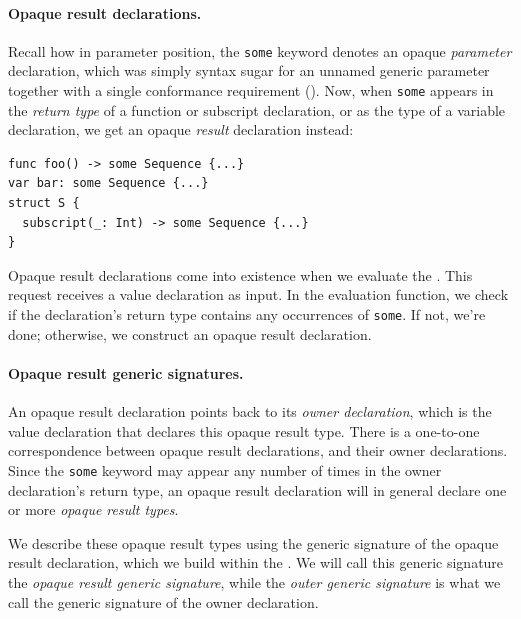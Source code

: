 \documentclass[../generics]{subfiles}
\begin{document}
\paragraph{Opaque result declarations.}
Recall how in parameter position, the \texttt{some} keyword denotes an opaque \emph{parameter} declaration, which was simply syntax sugar for an unnamed generic parameter together with a single conformance requirement (). Now, when \texttt{some} appears in the \emph{return type} of a function or subscript declaration, or as the type of a variable declaration, we get an opaque \emph{result} declaration instead:
\begin{Verbatim}
func foo() -> some Sequence {...}
var bar: some Sequence {...}
struct S {
  subscript(_: Int) -> some Sequence {...}
}
\end{Verbatim}
Opaque result declarations come into existence when we evaluate the . This request receives a value declaration as input. In the evaluation function, we check if the declaration's return type contains any occurrences of \texttt{some}. If not, we're done; otherwise, we construct an opaque result declaration.

\paragraph{Opaque result generic signatures.}
An opaque result declaration points back to its \emph{owner declaration}, which is the value declaration that declares this opaque result type. There is a one-to-one correspondence between opaque result declarations, and their owner declarations. Since the \texttt{some} keyword may appear any number of times in the owner declaration's return type, an opaque result declaration will in general declare one or more \emph{opaque result types}.

We describe these opaque result types using the generic signature of the opaque result declaration, which we build within the . We will call this generic signature the \emph{opaque result generic signature}, while the \emph{outer generic signature} is what we call the generic signature of the owner declaration.
\end{document}
